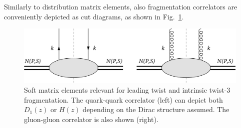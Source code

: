 Similarly to distribution matrix elements, also fragmentation correlators are conveniently depicted as cut diagrams, as shown in Fig.~\ref{fig:fragmentation corr I}.
\begin{figure}[h]
    \centering
    \includegraphics[width=0.8\linewidth]{fig/phi corr.png}
    \caption{Soft matrix elements relevant for leading twist and intrinsic twist-3 fragmentation. The quark-quark correlator (left) can depict both $D_1(z)$ or $H(z)$ depending on the Dirac structure assumed. The gluon-gluon correlator is also shown (right).}
    \label{fig:fragmentation corr I}
\end{figure}

